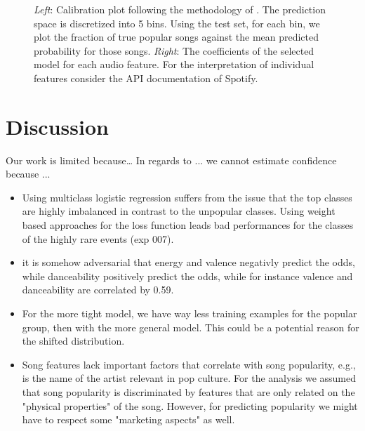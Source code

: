 \documentclass{article}
\begin{document}
\begin{figure}
  \caption{\textit{Left}: Calibration plot following the methodology of \cite{niculescu-mizilPredictingGoodProbabilities2005}. The prediction space is discretized into 5 bins. Using the test set, for each bin, we plot the fraction of true popular songs against the mean predicted probability for those songs. \textit{Right}: The coefficients of the selected model for each audio feature. For the interpretation of individual features consider the API documentation of Spotify.}
  \label{fig:logis_eval}
\end{figure}

  

\section{Discussion}
Our work is limited because\dots
In regards to ... we cannot estimate confidence because ...

\begin{itemize}
  \item Using multiclass logistic regression suffers from the issue that the top classes are highly imbalanced in contrast to the unpopular classes. Using weight based approaches for the loss function leads bad performances for the classes of the highly rare events (exp 007). 
  \item it is somehow adversarial that energy and valence negativly predict the odds, while danceability positively predict the odds, while for instance valence and danceability are correlated by 0.59.
\end{itemize}

\begin{itemize}
  \item For the more tight model, we have way less training examples for the popular group, then with the more general model. This could be a potential reason for the shifted distribution.
  \item Song features lack important factors that correlate with song popularity, e.g., is the name of the artist relevant in pop culture. For the analysis we assumed that song popularity is discriminated by features that are only related on the "physical properties" of the song. However, for predicting popularity we might have to respect some "marketing aspects" as well. 
\end{itemize}
\end{document}

